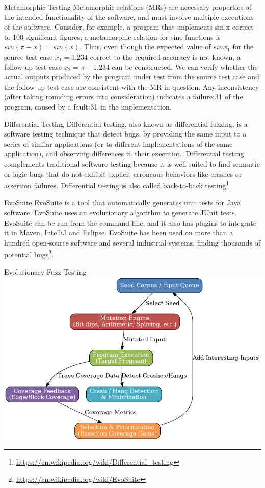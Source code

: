 \documentclass{beamer}
\begin{document}
\begin{frame}[t]{Metamorphic Testing}
Metamorphic relations (MRs) are necessary properties of the intended functionality of the software, and must involve multiple executions of the software. Consider, for example, a program that implements sin x correct to 100 significant figures; a metamorphic relation for sine functions is $sin (\pi − x) = sin(x)$. Thus, even though the expected value of $sin x_1$ for the source test case $x_1 = 1.234$ correct to the required accuracy is not known, a follow-up test case $x_2 = \pi − 1.234$ can be constructed. We can verify whether the actual outputs produced by the program under test from the source test case and the follow-up test case are consistent with the MR in question. Any inconsistency (after taking rounding errors into consideration) indicates a failure: 31  of the program, caused by a fault: 31  in the implementation.
\end{frame}
\begin{frame}[t]{Differential Testing}
    Differential testing, also known as differential fuzzing, is a software testing technique that detect bugs, by providing the same input to a series of similar applications (or to different implementations of the same application), and observing differences in their execution. Differential testing complements traditional software testing because it is well-suited to find semantic or logic bugs that do not exhibit explicit erroneous behaviors like crashes or assertion failures. Differential testing is also called back-to-back testing\footnote{\url{https://en.wikipedia.org/wiki/Differential_testing}}.
\end{frame}

\begin{frame}[t]{EvoSuite}
    EvoSuite is a tool that automatically generates unit tests for Java software. EvoSuite uses an evolutionary algorithm to generate JUnit tests. EvoSuite can be run from the command line, and it also has plugins to integrate it in Maven, IntelliJ and Eclipse. EvoSuite has been used on more than a hundred open-source software and several industrial systems, finding thousands of potential bugs\footnote{\url{https://en.wikipedia.org/wiki/EvoSuite}}.
\end{frame}

\begin{frame}[t]{Evolutionary Fuzz Testing}
    \includegraphics[width=.5\textwidth]{images/evo_fuzz.png} 
\end{frame}
\end{document}
